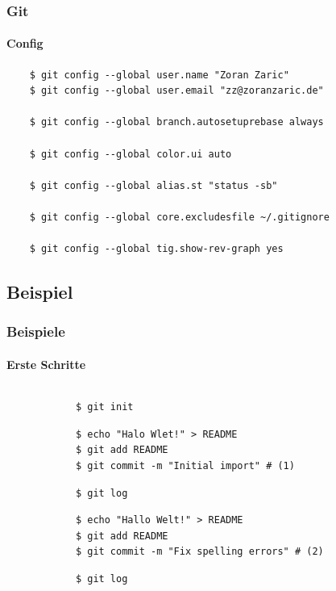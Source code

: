\documentclass[]{beamer}
\begin{document}
\begin{frame}[fragile]
	\frametitle{Git}
	\framesubtitle{Config}
	\begin{verbatim}
	$ git config --global user.name "Zoran Zaric"
	$ git config --global user.email "zz@zoranzaric.de"

	$ git config --global branch.autosetuprebase always

	$ git config --global color.ui auto

	$ git config --global alias.st "status -sb"

	$ git config --global core.excludesfile ~/.gitignore

	$ git config --global tig.show-rev-graph yes
	\end{verbatim}
\end{frame}

\subsection{Beispiel}
\begin{frame}[fragile]
	\frametitle{Beispiele}
	\framesubtitle{Erste Schritte}
	\begin{columns}[T]
		\begin{column}{7.5cm}
			\begin{verbatim}
			$ git init
			\end{verbatim}

			\begin{verbatim}
			$ echo "Halo Wlet!" > README
			$ git add README
			$ git commit -m "Initial import" # (1)
			\end{verbatim}

			\begin{verbatim}
			$ git log
			\end{verbatim}

			\begin{verbatim}
			$ echo "Hallo Welt!" > README
			$ git add README
			$ git commit -m "Fix spelling errors" # (2)
			\end{verbatim}

			\begin{verbatim}
			$ git log
			\end{verbatim}
		\end{column}
		\begin{column}{2.5cm}
		\end{column}
	\end{columns}
\end{frame}
\end{document}
